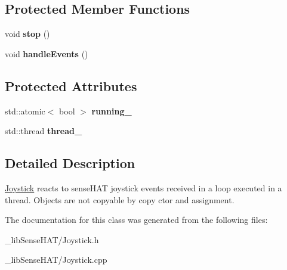 \subsection*{Protected Member Functions}
\begin{DoxyCompactItemize}
\item 
void {\bfseries stop} ()\hypertarget{class_joystick_a663bef4817dc643d2e54fe5083ae6177}{}\label{class_joystick_a663bef4817dc643d2e54fe5083ae6177}

\item 
void {\bfseries handle\+Events} ()\hypertarget{class_joystick_a5fa4903e3722b1e374db191dc75a1383}{}\label{class_joystick_a5fa4903e3722b1e374db191dc75a1383}

\end{DoxyCompactItemize}
\subsection*{Protected Attributes}
\begin{DoxyCompactItemize}
\item 
std\+::atomic$<$ bool $>$ {\bfseries running\+\_\+}\hypertarget{class_joystick_a3d79892eee022da43bee5658daeec7bd}{}\label{class_joystick_a3d79892eee022da43bee5658daeec7bd}

\item 
std\+::thread {\bfseries thread\+\_\+}\hypertarget{class_joystick_a885c832d840018ec59c82f081fa18060}{}\label{class_joystick_a885c832d840018ec59c82f081fa18060}

\end{DoxyCompactItemize}


\subsection{Detailed Description}
\hyperlink{class_joystick}{Joystick} reacts to sense\+H\+AT joystick events received in a loop executed in a thread. Objects are not copyable by copy ctor and assignment. 

The documentation for this class was generated from the following files\+:\begin{DoxyCompactItemize}
\item 
\+\_\+lib\+Sense\+H\+A\+T/Joystick.\+h\item 
\+\_\+lib\+Sense\+H\+A\+T/Joystick.\+cpp\end{DoxyCompactItemize}

